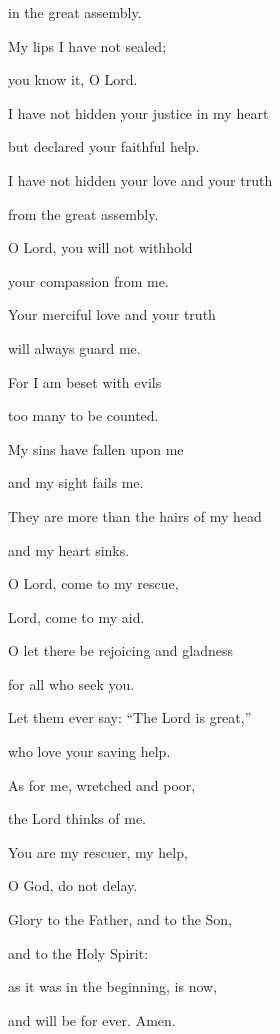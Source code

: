 in the great assembly.

\noindent My lips I have not sealed;~\GreStar{}~\nopagebreak

you know it, O Lord.

\noindent I have not hidden your justice in my heart~\GreStar{}~\nopagebreak

but declared your faithful help.

\noindent I have not hidden your love and your truth~\GreStar{}~\nopagebreak

from the great assembly.

\noindent O Lord, you will not withhold~\GreStar{}~\nopagebreak

your compassion from me.

\noindent Your merciful love and your truth~\GreStar{}~\nopagebreak

will always guard me.

\noindent For I am beset with evils~\GreStar{}~\nopagebreak

too many to be counted.

\noindent My sins have fallen upon me~\GreStar{}~\nopagebreak

and my sight fails me.

\noindent They are more than the hairs of my head~\GreStar{}~\nopagebreak

and my heart sinks.

\noindent O Lord, come to my rescue,~\GreStar{}~\nopagebreak

Lord, come to my aid.

\noindent O let there be rejoicing and gladness~\GreStar{}~\nopagebreak

for all who seek you.

\noindent Let them ever say: “The Lord is great,”~\GreStar{}~\nopagebreak

who love your saving help.

\noindent As for me, wretched and poor,~\GreStar{}~\nopagebreak

the Lord thinks of me.

\noindent You are my rescuer, my help,~\GreStar{}~\nopagebreak

O God, do not delay.

\noindent Glory to the Father, and to the Son,~\GreStar{}~\nopagebreak

and to the Holy Spirit:

\noindent as it was in the beginning, is now,~\GreStar{}~\nopagebreak

and will be for ever. Amen.